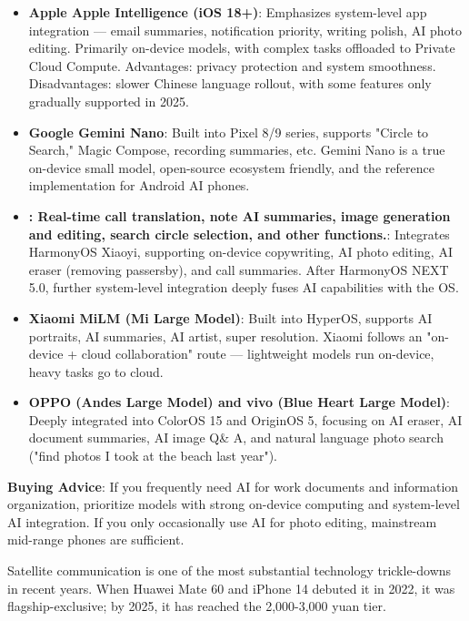 \begin{itemize}
  \item \textbf{Apple Apple Intelligence (iOS 18+)}: Emphasizes system-level app integration — email summaries, notification priority, writing polish, AI photo editing. Primarily on-device models, with complex tasks offloaded to Private Cloud Compute. Advantages: privacy protection and system smoothness. Disadvantages: slower Chinese language rollout, with some features only gradually supported in 2025.
  \item \textbf{Google Gemini Nano}: Built into Pixel 8/9 series, supports "Circle to Search," Magic Compose, recording summaries, etc. Gemini Nano is a true on-device small model, open-source ecosystem friendly, and the reference implementation for Android AI phones.
  \item \textbf{: Real-time call translation, note AI summaries, image generation and editing, search circle selection, and other functions.}: Integrates HarmonyOS Xiaoyi, supporting on-device copywriting, AI photo editing, AI eraser (removing passersby), and call summaries. After HarmonyOS NEXT 5.0, further system-level integration deeply fuses AI capabilities with the OS.
  \item \textbf{Xiaomi MiLM (Mi Large Model)}: Built into HyperOS, supports AI portraits, AI summaries, AI artist, super resolution. Xiaomi follows an "on-device + cloud collaboration" route — lightweight models run on-device, heavy tasks go to cloud.
  \item \textbf{OPPO (Andes Large Model) and vivo (Blue Heart Large Model)}: Deeply integrated into ColorOS 15 and OriginOS 5, focusing on AI eraser, AI document summaries, AI image Q\& A, and natural language photo search ("find photos I took at the beach last year").
\end{itemize}

\textbf{Buying Advice}: If you frequently need AI for work documents and information organization, prioritize models with strong on-device computing and system-level AI integration. If you only occasionally use AI for photo editing, mainstream mid-range phones are sufficient.


Satellite communication is one of the most substantial technology trickle-downs in recent years. When Huawei Mate 60 and iPhone 14 debuted it in 2022, it was flagship-exclusive; by 2025, it has reached the 2,000-3,000 yuan tier.

